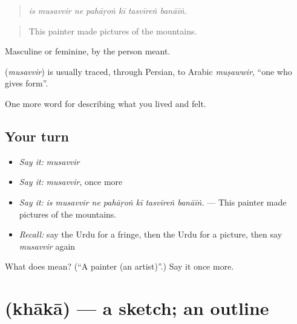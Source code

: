 \begin{quote}
      
\end{quote}

\begin{quote}
\emph{is musavvir ne pahāṛoṅ kī tasvīreṅ banāīṅ.}
\end{quote}

\begin{quote}
This painter made pictures of the mountains.
\end{quote}

Masculine or feminine, by the person meant.

\begin{cousinweb}
\textbf{} (\emph{musavvir}) is usually traced, through Persian, to Arabic \emph{muṣawwir}, \textquotedblleft{}one who gives form\textquotedblright{}.
\end{cousinweb}

\begin{grammarlens}[title={What you've built}]
One more word for describing what you lived and felt.
\end{grammarlens}

\subsection*{Your turn}
\begin{itemize}
\raggedright
  \item \emph{Say it:} \emph{musavvir}
  \item \emph{Say it:} \emph{musavvir}, once more
  \item \emph{Say it:} \emph{is musavvir ne pahāṛoṅ kī tasvīreṅ banāīṅ.} — This painter made pictures of the mountains.
  \item \emph{Recall:} say the Urdu for a fringe, then the Urdu for a picture, then say \emph{musavvir} again
\end{itemize}

\begin{tcolorbox}[breakable,colback=teal!4,colframe=teal!35!black,title={Before you move on}]
What does  mean? (\textquotedblleft{}A painter (an artist)\textquotedblright{}.) Say it once more.
\end{tcolorbox}
\section[\texorpdfstring{\ur{خاکہ} (khākā)}{خاکہ (khākā)}]{ (khākā) — a sketch; an outline}

